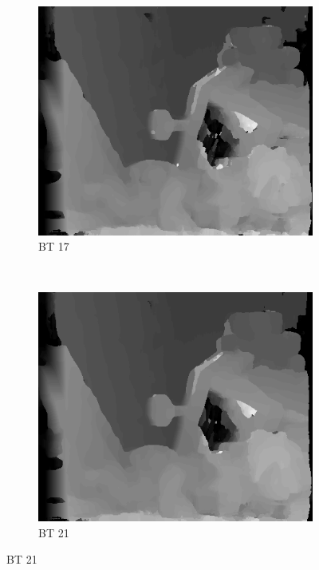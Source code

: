 \begin{figure}
\begin{subfigure}[b]{0.23\textwidth}
    \centering
    \includegraphics[width=\textwidth]{images/stereo-pairs/teddy_bt_17.png}
    \caption{BT 17}
  \end{subfigure}
  ~
  \begin{subfigure}[b]{0.23\textwidth}
    \centering
    \includegraphics[width=\textwidth]{images/stereo-pairs/teddy_bt_21.png}
    \caption{BT 21}
  \end{subfigure}


\end{figure}

